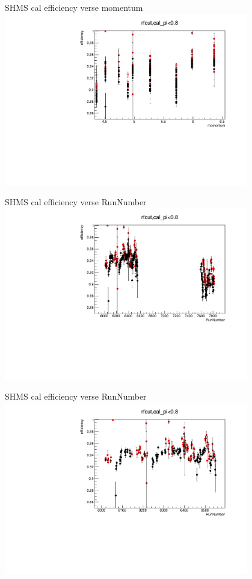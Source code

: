 \documentclass[aspectratio=169,xcolor=dvipsnames]{beamer}
\begin{document}
\begin{frame}{SHMS cal efficiency verse momentum}
  \includegraphics[width = 0.8\textwidth]{results/pid/SHMS_cal_DE_momentum.pdf}
\end{frame}
\begin{frame}{SHMS cal efficiency verse RunNumber}
  \includegraphics[width = 0.8\textwidth]{results/pid/SHMS_cal_DE_RunNumber.pdf}
\end{frame}
\begin{frame}{SHMS cal efficiency verse RunNumber}
  \includegraphics[width = 0.8\textwidth]{results/pid/SHMS_cal_DE_RunNumber_fall.pdf}
\end{frame}
\end{document}
